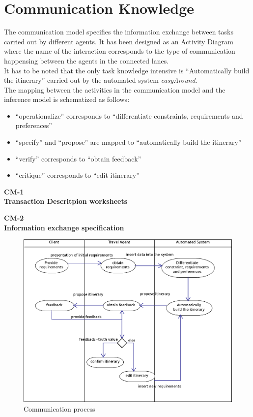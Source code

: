 \documentclass[11pt]{article} %
\def\worksheet#1#2{%
  \clearpage
  
  \begin{center}
  {\large\bf #1} \\
  {\normalsize\bf #2} \\[12pt]
  \begin{footnotesize}
  
  \end{footnotesize}
  \end{center}  
  \vfill}
\begin{document}
\section{Communication Knowledge}
The communication model specifies the information exchange between tasks carried out by different agents. It has been designed as an Activity Diagram where the name of the interaction corresponds to the type of communication happensing between the agents in the connected lanes.\\
It has to be noted that the only task knowledge intensive is ``Automatically build the itinerary'' carried out by the automated system \textit{easyAround}.\\
The mapping between the activities in the communication model and the inference model is schematized as follows:
\begin{itemize}
\item ``operationalize'' corresponds to ``differentiate constraints, requirements and preferences''
\item ``specify'' and ``propose'' are mapped to ``automatically build the itinerary''
\item ``verify'' corresponds to ``obtain feedback''
\item ``critique'' corresponds to ``edit itinerary''
\end{itemize}

\worksheet{CM-1}{Transaction Descritpion worksheets}

\worksheet{CM-2}{Information exchange specification}

\begin{figure}[h]
\centering
\includegraphics[width=\textwidth]{images/communication.eps}
\caption{Communication process}
\label{fig:CommunicationDiagram}
\end{figure}
\end{document}
